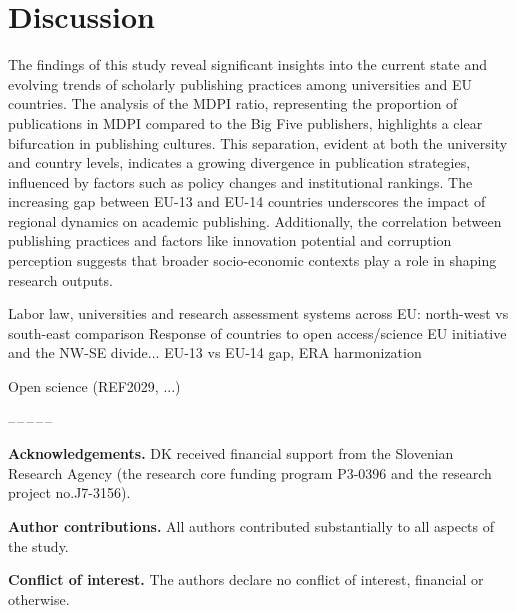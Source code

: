 \documentclass[amsfonts, amssymb, prl, superscriptaddress, notitlepage, twocolumn, nofootinbib]{revtex4-2}
\begin{document}
\section{Discussion}
The findings of this study reveal significant insights into the current state and evolving trends of scholarly publishing practices among universities and EU countries. The analysis of the MDPI ratio, representing the proportion of publications in MDPI compared to the Big Five publishers, highlights a clear bifurcation in publishing cultures. This separation, evident at both the university and country levels, indicates a growing divergence in publication strategies, influenced by factors such as policy changes and institutional rankings. The increasing gap between EU-13 and EU-14 countries underscores the impact of regional dynamics on academic publishing. Additionally, the correlation between publishing practices and factors like innovation potential and corruption perception suggests that broader socio-economic contexts play a role in shaping research outputs. 

Labor law, universities and research assessment systems across EU: north-west vs south-east comparison 
Response of countries to open access/science EU initiative and the NW-SE divide... EU-13 vs EU-14 gap, ERA harmonization

Open science (REF2029, ...)
  
\begin{center}
--\,--\,--\,--\,--
\end{center}
\vspace{1mm}
\noindent\textbf{Acknowledgements.} DK received financial support from the Slovenian Research Agency (the research core funding program P3-0396 and the research project no.J7-3156). 


\noindent\textbf{Author contributions.} All authors contributed substantially to all aspects of the study.

\noindent\textbf{Conflict of interest.} The authors declare no conflict of interest, financial or otherwise.


{}

\end{document}

